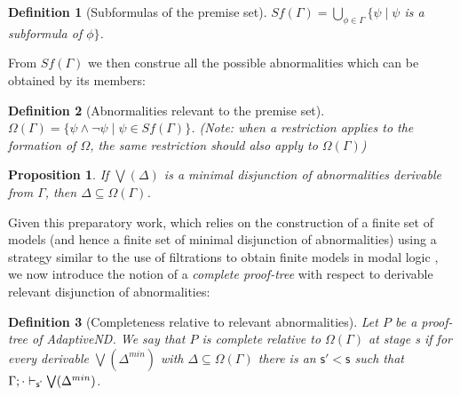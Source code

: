 \documentclass[]{article}
\newtheorem{definition}{Definition}
\newtheorem{proposition}{Proposition}
\newcommand{\Turn}[2]
    { {#1}\vdash_{\textbf{\sf s}}  {#2}}
\newcommand{\TurnPrime}[2]
    { {#1}\vdash_{\textbf{\sf s'}}  {#2}}
\newcommand{\TurnPrimePrime}[2]
    { {#1}\vdash_{\textbf{\sf s''}}  {#2}}
\begin{document}


\begin{definition}[Subformulas of the premise set]
$Sf(\Gamma)=\bigcup_{\phi \in \Gamma} \{\psi \mid \psi$ is a subformula of $ \phi\}$.
\end{definition}


From $Sf(\Gamma)$ we then construe all the possible abnormalities which can be obtained by its members:

\begin{definition}[Abnormalities relevant to the premise set]
$\Omega(\Gamma)=\{\psi\wedge \neg \psi \mid \psi\in Sf(\Gamma)\}$. (Note: when a restriction applies to the formation of $\Omega$, the same restriction should also apply to $\Omega(\Gamma)$)
\end{definition}
%
%
\begin{proposition}
    If $\bigvee(\Delta)$ is a minimal disjunction of abnormalities derivable from $\Gamma$, then $\Delta \subseteq \Omega(\Gamma)$.
\end{proposition}
Given this preparatory work, which relies on the construction of a finite set of models (and hence a finite set of minimal disjunction of abnormalities) using a strategy similar to the use of filtrations to obtain finite models in modal logic \cite[77ff]{Blackburn:ModalLogic:2001}, we now introduce the notion of a \textit{complete proof-tree} with respect to derivable relevant disjunction of abnormalities:

\begin{definition}[Completeness relative to relevant abnormalities]
Let $P$ be a proof-tree of {\sf AdaptiveND}. We say that $P$ is complete relative to $\Omega(\Gamma)$ at stage {\sf s} if for every derivable $\bigvee(\Delta^{min})$ with $\Delta\subseteq\Omega(\Gamma)$ there is an $\mathsf{s' < s}$ such that $\TurnPrime{\Gamma;\cdot}{\bigvee(\Delta^{min})}$.

%
\end{definition}
\end{document}
